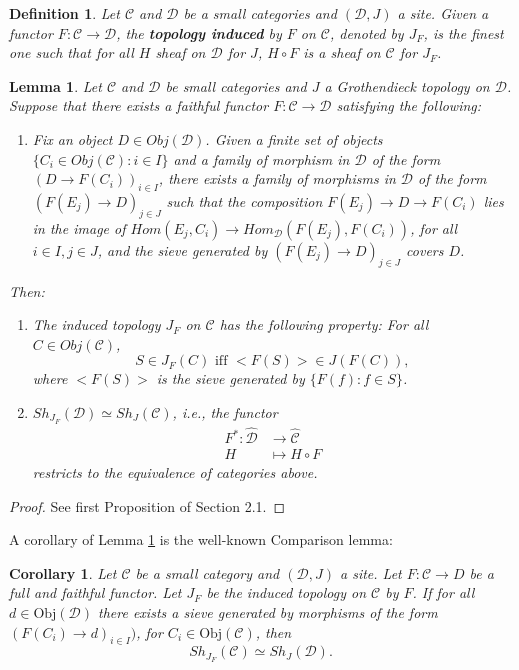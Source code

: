 \documentclass[10pt,longbibliography]{article}
\newtheorem{Def}[Theo]{Definition}
\newtheorem{Lemma}[Theo]{Lemma}
\newtheorem{Corolary}[Theo]{Corollary}
\newcommand{\C}{\mathcal{C}}
\newcommand{\D}{\mathcal{D}}
\begin{document}
\begin{Def}
	Let $\C$ and $\D$ be a small categories and $(\D,J)$ a site. Given a functor $F: \C \to \D$, the \textbf{topology induced} by $F$ on $\C$, denoted by $J_{F}$, is the finest one such that for all $H$ sheaf on $\D$ for $J$, $H \circ F$ is a sheaf on $\C$ for $J_{F}$.
\end{Def}


\begin{Lemma}\label{BeilinsonLemma}
	Let $\C$ and $\D$ be  small categories and $J$ a Grothendieck topology on $\D$. Suppose that there exists a faithful functor $F: \C \to \D$ satisfying the following:
	\begin{enumerate}
		
		
		\item[] Fix an object $D \in Obj(\D)$. Given a finite set of objects $\{C_{i} \in Obj(\C): i \in I\}$ and a family of morphism in $\D$ of the form $(D \to F(C_{i}))_{i \in I}$, there exists a family of morphisms  in $\D$ of the form $(F(E_{j}) \to D)_{j \in J}$ such that the composition $F(E_{j}) \to D \to F(C_{i})$ lies in the image of $Hom(E_{j},C_{i}) \to Hom_{\D}(F(E_{j}),F(C_{i}))$, for all $i \in I, j \in J$, and the sieve generated by $(F(E_{j}) \to D)_{j \in J}$ covers $D$.
	\end{enumerate}
	Then:
	\begin{enumerate}
		\item The induced topology $J_{F}$ on $\C$ has the following property: For all $C \in Obj(\C)$,
		$$S \in J_{F}(C) \text{ iff } <F(S)> \in J(F(C)),$$
		where $<F(S)>$ is the sieve generated by $ \{F(f): f \in S\}$.
		
		\item $Sh_{J_{F}}(\D) \simeq Sh_{J}(\C)$, i.e., the functor
		\begin{align*}
				F^{*}:\widehat{\D} &\to \widehat{\C} \\
							H &\mapsto H \circ F
		\end{align*}
		restricts to the equivalence of categories above.
	\end{enumerate}
	
\end{Lemma}

\begin{proof}
	See \cite{Bei12} first Proposition of Section 2.1.
\end{proof}

A corollary of Lemma \ref{BeilinsonLemma} is the well-known Comparison lemma:

\begin{Corolary}\label{comparisonlemma}
	Let $\C$ be a small category and $(\D,J)$ a site. Let $F: \C \to D$ be a full and faithful functor. Let $J_{F}$ be the induced topology on $\C$ by $F$. If for all $d \in \text{Obj}(\D)$ there exists a sieve generated by morphisms of the form $(F(C_{i}) \to d)_{i \in I})$, for $C_{i} \in \text{Obj}(\C)$, then
	$$Sh_{J_{F}}(\C) \simeq Sh_{J}(\D).$$
\end{Corolary}
\end{document}
